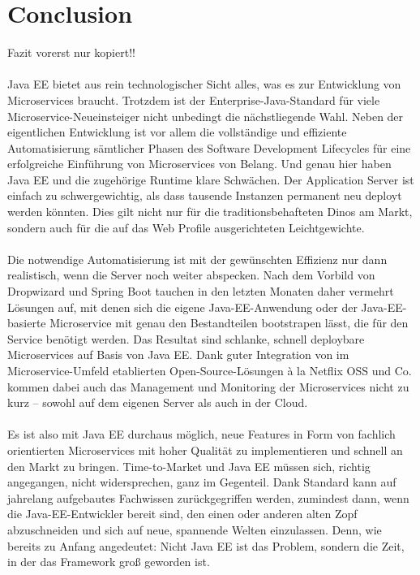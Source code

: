 \section{Conclusion}
Fazit vorerst nur kopiert!!\\ \\
Java EE bietet aus rein technologischer Sicht alles, was es zur Entwicklung von Microservices braucht. Trotzdem ist der Enterprise-Java-Standard für viele Microservice-Neueinsteiger nicht unbedingt die nächstliegende Wahl. Neben der eigentlichen Entwicklung ist vor allem die vollständige und effiziente Automatisierung sämtlicher Phasen des Software Development Lifecycles für eine erfolgreiche Einführung von Microservices von Belang. Und genau hier haben Java EE und die zugehörige Runtime klare Schwächen. Der Application Server ist einfach zu schwergewichtig, als dass tausende Instanzen permanent neu deployt werden könnten. Dies gilt nicht nur für die traditionsbehafteten Dinos am Markt, sondern auch für die auf das Web Profile ausgerichteten Leichtgewichte.\\ \\
Die notwendige Automatisierung ist mit der gewünschten Effizienz nur dann realistisch, wenn die Server noch weiter abspecken. Nach dem Vorbild von Dropwizard und Spring Boot tauchen in den letzten Monaten daher vermehrt Lösungen auf, mit denen sich die eigene Java-EE-Anwendung oder der Java-EE-basierte Microservice mit genau den Bestandteilen bootstrapen lässt, die für den Service benötigt werden. Das Resultat sind schlanke, schnell deploybare Microservices auf Basis von Java EE. Dank guter Integration von im Microservice-Umfeld etablierten Open-Source-Lösungen à la Netflix OSS und Co. kommen dabei auch das Management und Monitoring der Microservices nicht zu kurz – sowohl auf dem eigenen Server als auch in der Cloud. \\ \\
Es ist also mit Java EE durchaus möglich, neue Features in Form von fachlich orientierten Microservices mit hoher Qualität zu implementieren und schnell an den Markt zu bringen. Time-to-Market und Java EE müssen sich, richtig angegangen, nicht widersprechen, ganz im Gegenteil. Dank Standard kann auf jahrelang aufgebautes Fachwissen zurückgegriffen werden, zumindest dann, wenn die Java-EE-Entwickler bereit sind, den einen oder anderen alten Zopf abzuschneiden und sich auf neue, spannende Welten einzulassen. Denn, wie bereits zu Anfang angedeutet: Nicht Java EE ist das Problem, sondern die Zeit, in der das Framework groß geworden ist.\\ \\
